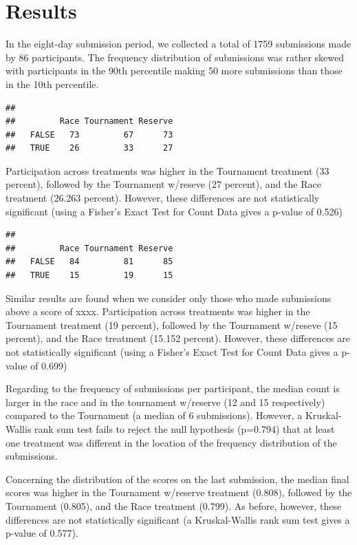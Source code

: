 \documentclass[12pt,]{article}
\begin{document}
\clearpage

\section{Results}\label{results}

In the eight-day submission period, we collected a total of 1759
submissions made by 86 participants. The frequency distribution of
submissions was rather skewed with participants in the 90th percentile
making 50 more submissions than those in the 10th percentile.

\begin{verbatim}
##        
##         Race Tournament Reserve
##   FALSE   73         67      73
##   TRUE    26         33      27
\end{verbatim}

Participation across treatments was higher in the Tournament treatment
(33 percent), followed by the Tournament w/reseve (27 percent), and the
Race treatment (26.263 percent). However, these differences are not
statistically significant (using a Fisher's Exact Test for Count Data
gives a p-value of 0.526)

\begin{verbatim}
##        
##         Race Tournament Reserve
##   FALSE   84         81      85
##   TRUE    15         19      15
\end{verbatim}

Similar results are found when we consider only those who made
submissions above a score of xxxx. Participation across treatments was
higher in the Tournament treatment (19 percent), followed by the
Tournament w/reseve (15 percent), and the Race treatment (15.152
percent). However, these differences are not statistically significant
(using a Fisher's Exact Test for Count Data gives a p-value of 0.699)

Regarding to the frequency of submissions per participant, the median
count is larger in the race and in the tournament w/reserve (12 and 15
respectively) compared to the Tournament (a median of 6 submissions).
However, a Kruskal-Wallis rank sum test fails to reject the null
hypothesis (p=0.794) that at least one treatment was different in the
location of the frequency distribution of the submissions.

Concerning the distribution of the scores on the last submission, the
median final scores was higher in the Tournament w/reserve treatment
(0.808), followed by the Tournament (0.805), and the Race treatment
(0.799). As before, however, these differences are not statistically
significant (a Kruskal-Wallis rank sum test gives a p-value of 0.577).
\end{document}
